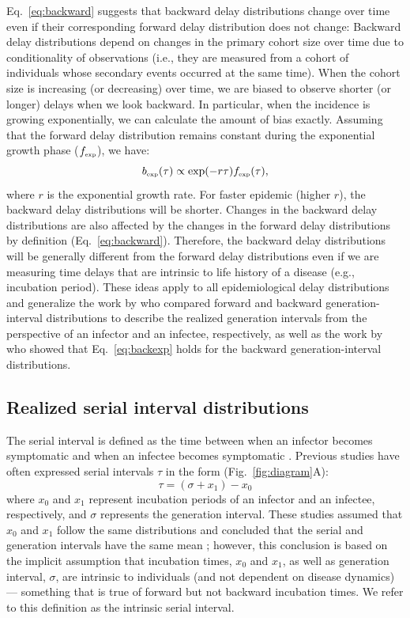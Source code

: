\documentclass[12pt]{article}
\newcommand{\eref}[1]{Eq.~\ref{eq:#1}}
\newcommand{\fref}[1]{Fig.~\ref{fig:#1}}
\newcommand{\tsub}[2]{#1_{{\textrm{\tiny #2}}}}
\newcommand{\gtime}{\sigma} %
\begin{document}
\eref{backward} suggests that backward delay distributions change over time even if their corresponding forward delay distribution does not change:
Backward delay distributions depend on changes in the primary cohort size over time due to conditionality of observations (i.e., they are measured from a cohort of individuals whose secondary events occurred at the same time).
When the cohort size is increasing (or decreasing) over time, we are biased to observe shorter (or longer) delays when we look backward.
In particular, when the incidence is growing exponentially, we can calculate the amount of bias exactly.
Assuming that the forward delay distribution remains constant during the exponential growth phase ($\tsub{f}{exp}$), we have:
\begin{equation}
\tsub{b}{exp}(\tau) \propto \exp(-r\tau) \tsub{f}{exp}(\tau),
\label{eq:backexp}
\end{equation}
where $r$ is the exponential growth rate.
For faster epidemic (higher $r$), the backward delay distributions will be shorter.
Changes in the backward delay distributions are also affected by the changes in the forward delay distributions by definition (\eref{backward}).
Therefore, the backward delay distributions will be generally different from the forward delay distributions even if we are measuring time delays that are intrinsic to life history of a disease (e.g., incubation period).
These ideas apply to all epidemiological delay distributions and generalize the work by \cite{champredon2015intrinsic} who compared forward and backward generation-interval distributions to describe the realized generation intervals from the perspective of an infector and an infectee, respectively, as well as the work by \cite{britton2019estimation} who showed that \eref{backexp} holds for the backward generation-interval distributions.

\subsection{Realized serial interval distributions}

The serial interval is defined as the time between when an infector becomes symptomatic and when an infectee becomes symptomatic \citep{svensson2007note}.
Previous studies have often expressed serial intervals $\tau$ in the form (\fref{diagram}A):
\begin{equation}
\tau = (\gtime + x_1) - x_0
\end{equation}
where $x_0$ and $x_1$ represent incubation periods of an infector and an infectee, respectively, and $\gtime$ represents the generation interval.
These studies assumed that $x_0$ and $x_1$ follow the same distributions and concluded that the serial and generation intervals have the same mean \citep{svensson2007note,klinkenberg2011correlation,champredon2018equivalence, britton2019estimation};
however, this conclusion is based on the implicit assumption that incubation times, $x_0$ and $x_1$, as well as generation interval, $\gtime$, are intrinsic to individuals (and not dependent on disease dynamics) --- something that is true of forward but not backward incubation times.
We refer to this definition as the intrinsic serial interval.
\end{document}
